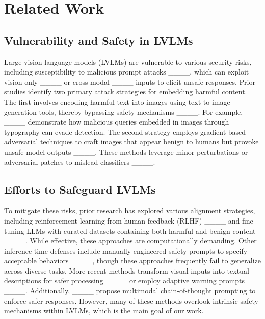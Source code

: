 \section{Related Work}
\subsection{Vulnerability and Safety in LVLMs}
Large vision-language models (LVLMs) are vulnerable to various security risks, including susceptibility to malicious prompt attacks ____, which can exploit vision-only ____ or cross-modal ____ inputs to elicit unsafe responses. Prior studies identify two primary attack strategies for embedding harmful content. The first involves encoding harmful text into images using text-to-image generation tools, thereby bypassing safety mechanisms ____. For example, ____ demonstrate how malicious queries embedded in images through typography can evade detection. The second strategy employs gradient-based adversarial techniques to craft images that appear benign to humans but provoke unsafe model outputs ____. These methods leverage minor perturbations or adversarial patches to mislead classifiers ____.



\subsection{Efforts to Safeguard LVLMs}

To mitigate these risks, prior research has explored various alignment strategies, including reinforcement learning from human feedback (RLHF) ____ and fine-tuning LLMs with curated datasets containing both harmful and benign content ____. While effective, these approaches are computationally demanding. Other inference-time defenses include manually engineered safety prompts to specify acceptable behaviors ____, though these approaches frequently fail to generalize across diverse tasks. More recent methods transform visual inputs into textual descriptions for safer processing ____ or employ adaptive warning prompts ____. Additionally, ____ propose multimodal chain-of-thought prompting to enforce safer responses. However, many of these methods overlook intrinsic safety mechanisms within LVLMs, which is the main goal of our work.

